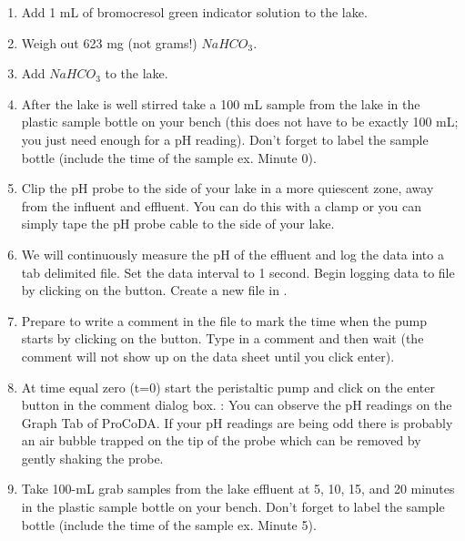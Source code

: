 \documentclass[letterpaper,10pt,english]{sphinxmanual}
\begin{document}
\begin{enumerate}
\item {} 
Add 1 mL of bromocresol green indicator solution to the lake.

\item {} 
Weigh out 623 mg (not grams!) \(NaHCO_3\).

\item {} 
Add \(NaHCO_3\) to the lake.

\item {} 
After the lake is well stirred take a 100 mL sample from the lake in the plastic sample bottle on your bench (this does not have to be exactly 100 mL; you just need enough for a pH reading). Don’t forget to label the sample bottle (include the time of the sample ex. Minute 0).

\item {} 
Clip the pH probe to the side of your lake in a more quiescent zone, away from the influent and effluent. You can do this with a clamp or you can simply tape the pH probe cable to the side of your lake.

\item {} 
We will continuously measure the pH of the effluent and log the data into a tab delimited file. Set the data interval to 1 second. Begin logging data to file by clicking on the  button. Create a new file in .

\item {} 
Prepare to write a comment in the file to mark the time when the pump starts by clicking on the  button. Type in a comment and then wait (the comment will not show up on the data sheet until you click enter).

\item {} 
At time equal zero (t=0) start the peristaltic pump and click on the enter button in the comment dialog box. : You can observe the pH readings on the Graph Tab of ProCoDA. If your pH readings are being odd there is probably an air bubble trapped on the tip of the probe which can be removed by gently shaking the probe.

\item {} 
Take 100-mL grab samples from the lake effluent at 5, 10, 15, and 20 minutes in the plastic sample bottle on your bench. Don’t forget to label the sample bottle (include the time of the sample ex. Minute 5).


\end{enumerate}
\end{document}
